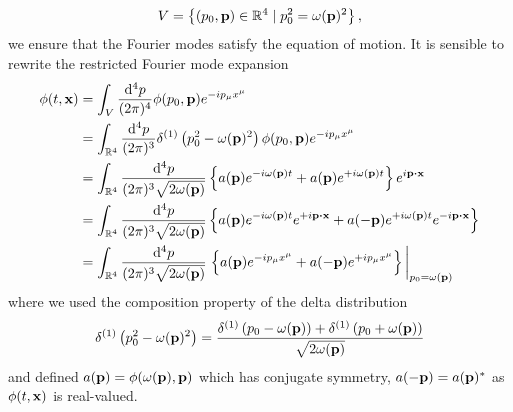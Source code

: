 \begin{equation}
	V
	=
	\left\{
		(p_0,\vb{p})\in\mathbb{R}^4
		\mid
		p_0^2=\omega(\vb{p})^2
	\right\}
	\label{eq:momentum_lightcone},
\end{equation}
we ensure that the Fourier modes satisfy the equation of motion.
It is sensible to rewrite the restricted Fourier mode expansion
\begin{equation}
	\begin{split}
		\phi(t,\vb{x})
		&=
		\int_V\frac{\dd[4]{p}}{(2\pi)^4}
		\phi(p_0,\vb{p})e^{-ip_\mu x^\mu}
		\\
		&=
		\int_{\mathbb{R}^4}\frac{\dd[4]{p}}{(2\pi)^3}
		\delta^{(1)}\left(p_0^2-\omega(\vb{p})^2\right)
		\phi(p_0,\vb{p})e^{-ip_\mu x^\mu}
		\\
		&=
		\int_{\mathbb{R}^4}\frac{\dd[4]{p}}{(2\pi)^3\sqrt{2\omega(\vb{p})}}
		\left\{
			a(\vb{p})
			e^{-i\omega(\vb{p})t}
			+
			a(\vb{p})
			e^{+i\omega(\vb{p})t}
		\right\}
		e^{i\vb{p}\vdot\vb{x}}
		\\
		&=
		\int_{\mathbb{R}^4}\frac{\dd[4]{p}}{(2\pi)^3\sqrt{2\omega(\vb{p})}}
		\left\{
			a(\vb{p})
			e^{-i\omega(\vb{p})t}
			e^{+i\vb{p}\vdot\vb{x}}
			+
			a(-\vb{p})
			e^{+i\omega(\vb{p})t}
			e^{-i\vb{p}\vdot\vb{x}}
		\right\}
		\\
		&=
		\int_{\mathbb{R}^4}\frac{\dd[4]{p}}{(2\pi)^3\sqrt{2\omega(\vb{p})}}
		\eval{\left\{
			a(\vb{p})
			e^{-ip_\mu x^\mu}
			+
			a(-\vb{p})
			e^{+ip_\mu x^\mu}
		\right\}}_{p_0=\omega(\vb{p})}
	\end{split}
	\label{eq:kg_ft_final}
\end{equation}
where we used the composition property of the delta distribution
\begin{equation}
	\delta^{(1)}\left(p_0^2-\omega(\vb{p})^2\right)
	=
	\frac{
		\delta^{(1)}\left(p_0-\omega(\vb{p})\right)
		+
		\delta^{(1)}\left(p_0+\omega(\vb{p})\right)
	}{\sqrt{2\omega(\vb{p})}}
	\label{eq:kg_em_delta}
\end{equation}
and defined $a(\vb{p})=\phi(\omega(\vb{p}),\vb{p})$ which has conjugate symmetry, $a(-\vb{p})=a(\vb{p})^*$ as $\phi(t,\vb{x})$ is real-valued.

